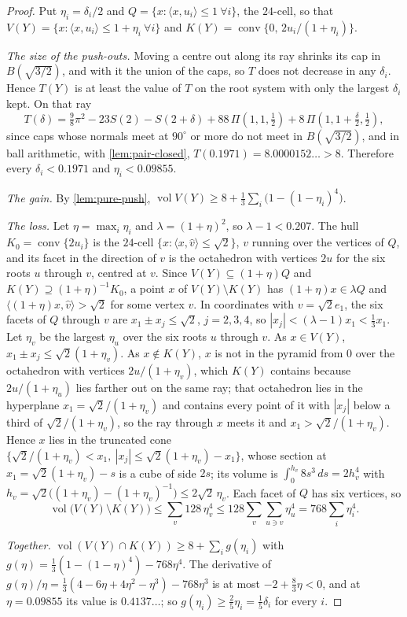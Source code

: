\documentclass[11pt,reqno]{amsart}
\renewcommand{\_}{\origunderscore\allowbreak}
\numberwithin{equation}{section}
\theoremstyle{plain}
\theoremstyle{definition}
\theoremstyle{remark}
\DeclareMathOperator{\vol}{vol}
\DeclareMathOperator{\conv}{conv}
\begin{document}
\begin{proof}
Put $\eta_i=\delta_i/2$ and $Q=\{x:\langle x,u_i\rangle\le1\ \forall i\}$, the
$24$-cell, so that $V(Y)=\{x:\langle x,u_i\rangle\le1+\eta_i\ \forall i\}$
and $K(Y)=\conv\{0,\,2u_i/(1+\eta_i)\}$.

\emph{The size of the push-outs.} Moving a centre out along its ray shrinks
its cap in $B(\sqrt{3/2})$, and with it the union of the caps, so $T$ does
not decrease in any $\delta_i$. Hence $T(Y)$ is at least the value of $T$ on
the root system with only the largest $\delta_i$ kept. On that ray
\[
  T(\delta)=\tfrac98\pi^2-23S(2)-S(2+\delta)+88\,\Pi(1,1,\tfrac12)
  +8\,\Pi(1,1+\tfrac\delta2,\tfrac12),
\]
since caps whose normals meet at $90^\circ$ or more do not meet in
$B(\sqrt{3/2})$, and in ball arithmetic, with \cref{lem:pair-closed},
$T(0.1971)=8.0000152\ldots>8$. Therefore every $\delta_i<0.1971$ and
$\eta_i<0.09855$.

\emph{The gain.} By \cref{lem:pure-push},
$\vol V(Y)\ge8+\frac13\sum_i\bigl(1-(1-\eta_i)^4\bigr)$.

\emph{The loss.} Let $\eta=\max_i\eta_i$ and $\lambda=(1+\eta)^2$, so
$\lambda-1<0.207$. The hull $K_0=\conv\{2u_i\}$ is the $24$-cell
$\{x:\langle x,\hat v\rangle\le\sqrt2\}$, $v$ running over the vertices of
$Q$, and its facet in the direction of $v$ is the octahedron with vertices
$2u$ for the six roots $u$ through $v$, centred at $v$. Since
$V(Y)\subseteq(1+\eta)Q$ and $K(Y)\supseteq(1+\eta)^{-1}K_0$, a point $x$ of
$V(Y)\setminus K(Y)$ has $(1+\eta)x\in\lambda Q$ and
$\langle(1+\eta)x,\hat v\rangle>\sqrt2$ for some vertex $v$. In coordinates
with $v=\sqrt2e_1$, the six facets of $Q$ through $v$ are
$x_1\pm x_j\le\sqrt2$, $j=2,3,4$, so $|x_j|<(\lambda-1)x_1<\frac13x_1$.
Let $\eta_v$ be the largest $\eta_u$ over the six roots $u$ through $v$. As
$x\in V(Y)$, $x_1\pm x_j\le\sqrt2(1+\eta_v)$. As $x\notin K(Y)$, $x$ is not
in the pyramid from $0$ over the octahedron with vertices $2u/(1+\eta_v)$,
which $K(Y)$ contains because $2u/(1+\eta_u)$ lies farther out on the same
ray; that octahedron lies in the hyperplane $x_1=\sqrt2/(1+\eta_v)$ and
contains every point of it with $|x_j|$ below a third of $\sqrt2/(1+\eta_v)$,
so the ray through $x$ meets it and $x_1>\sqrt2/(1+\eta_v)$. Hence $x$ lies in
the truncated cone
$\{\sqrt2/(1+\eta_v)<x_1,\ |x_j|\le\sqrt2(1+\eta_v)-x_1\}$, whose section at
$x_1=\sqrt2(1+\eta_v)-s$ is a cube of side $2s$; its volume is
$\int_0^{h_v}8s^3\,ds=2h_v^4$ with
$h_v=\sqrt2\bigl((1+\eta_v)-(1+\eta_v)^{-1}\bigr)\le2\sqrt2\,\eta_v$. Each
facet of $Q$ has six vertices, so
\[
  \vol\bigl(V(Y)\setminus K(Y)\bigr)\le\sum_v128\,\eta_v^4
  \le128\sum_v\sum_{u\ni v}\eta_u^4=768\sum_i\eta_i^4 .
\]

\emph{Together.} $\vol(V(Y)\cap K(Y))\ge8+\sum_ig(\eta_i)$ with
$g(\eta)=\frac13(1-(1-\eta)^4)-768\eta^4$. The derivative of
$g(\eta)/\eta=\frac13(4-6\eta+4\eta^2-\eta^3)-768\eta^3$ is at most
$-2+\frac83\eta<0$, and at $\eta=0.09855$ its value is $0.4137\ldots$; so
$g(\eta_i)\ge\frac25\eta_i=\frac15\delta_i$ for every $i$.
\end{proof}
\end{document}
